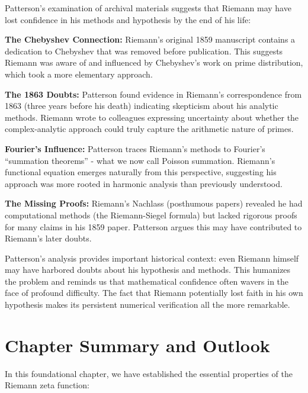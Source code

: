 \begin{historicalnote}
Patterson's examination of archival materials suggests that Riemann may have lost confidence in his methods and hypothesis by the end of his life:

\textbf{The Chebyshev Connection:} Riemann's original 1859 manuscript contains a dedication to Chebyshev that was removed before publication. This suggests Riemann was aware of and influenced by Chebyshev's work on prime distribution, which took a more elementary approach.

\textbf{The 1863 Doubts:} Patterson found evidence in Riemann's correspondence from 1863 (three years before his death) indicating skepticism about his analytic methods. Riemann wrote to colleagues expressing uncertainty about whether the complex-analytic approach could truly capture the arithmetic nature of primes.

\textbf{Fourier's Influence:} Patterson traces Riemann's methods to Fourier's ``summation theorems'' - what we now call Poisson summation. Riemann's functional equation emerges naturally from this perspective, suggesting his approach was more rooted in harmonic analysis than previously understood.

\textbf{The Missing Proofs:} Riemann's Nachlass (posthumous papers) revealed he had computational methods (the Riemann-Siegel formula) but lacked rigorous proofs for many claims in his 1859 paper. Patterson argues this may have contributed to Riemann's later doubts.
\end{historicalnote}

\begin{remark}
Patterson's analysis provides important historical context: even Riemann himself may have harbored doubts about his hypothesis and methods. This humanizes the problem and reminds us that mathematical confidence often wavers in the face of profound difficulty. The fact that Riemann potentially lost faith in his own hypothesis makes its persistent numerical verification all the more remarkable.
\end{remark}

\section{Chapter Summary and Outlook}
\label{sec:chapter_summary}

In this foundational chapter, we have established the essential properties of the Riemann zeta function:

